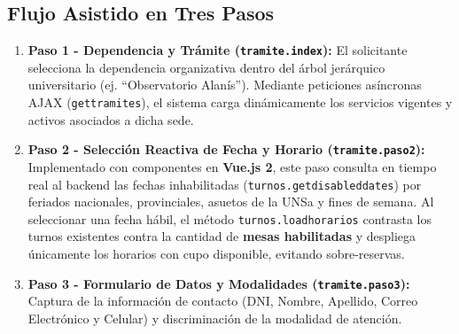 \subsection{Flujo Asistido en Tres Pasos}
\begin{enumerate}
    \item \textbf{Paso 1 - Dependencia y Trámite (\texttt{tramite.index}):} El solicitante selecciona la dependencia organizativa dentro del árbol jerárquico universitario (ej. ``Observatorio Alanís''). Mediante peticiones asíncronas AJAX (\texttt{gettramites}), el sistema carga dinámicamente los servicios vigentes y activos asociados a dicha sede.
    \item \textbf{Paso 2 - Selección Reactiva de Fecha y Horario (\texttt{tramite.paso2}):} Implementado con componentes en \textbf{Vue.js 2}, este paso consulta en tiempo real al backend las fechas inhabilitadas (\texttt{turnos.getdisableddates}) por feriados nacionales, provinciales, asuetos de la UNSa y fines de semana. Al seleccionar una fecha hábil, el método \texttt{turnos.loadhorarios} contrasta los turnos existentes contra la cantidad de \textbf{mesas habilitadas} y despliega únicamente los horarios con cupo disponible, evitando sobre-reservas.
    \item \textbf{Paso 3 - Formulario de Datos y Modalidades (\texttt{tramite.paso3}):} Captura de la información de contacto (DNI, Nombre, Apellido, Correo Electrónico y Celular) y discriminación de la modalidad de atención.
\end{enumerate}

